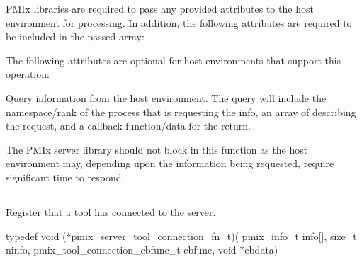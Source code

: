 \reqattrstart
\ac{PMIx} libraries are required to pass any provided attributes to the host environment for processing. In addition, the following attributes are required to be included in the passed  array:


\reqattrend


\optattrstart
The following attributes are optional for host environments that support this operation:


\optattrend
\descr

Query information from the host environment.
The query will include the namespace/rank of the process that is requesting the info, an array of  describing the request, and a callback function/data for the return.

\adviceimplstart
The \ac{PMIx} server library should not block in this function as the host environment may, depending upon the information being requested, require significant time to respond.
\adviceimplend



\subsection{}

\summary

Register that a tool has connected to the server.

\format

\cspecificstart
\begin{codepar}
typedef void (*pmix_server_tool_connection_fn_t)(
                             pmix_info_t info[], size_t ninfo,
                             pmix_tool_connection_cbfunc_t cbfunc,
                             void *cbdata)
\end{codepar}
\cspecificend

